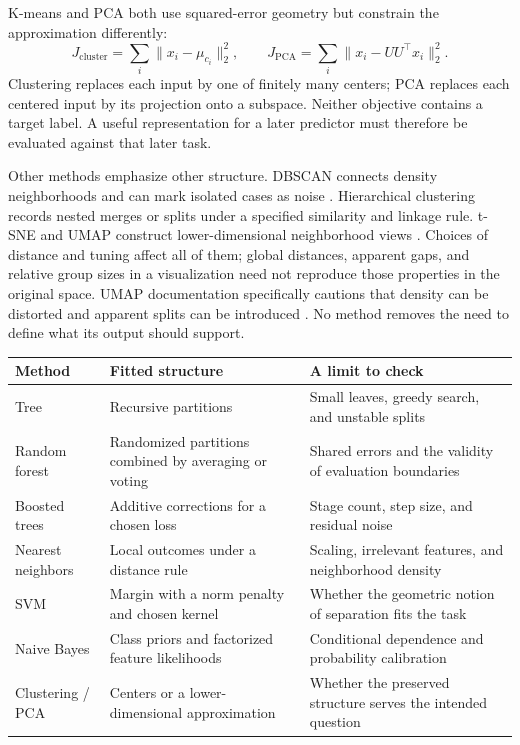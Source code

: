 K-means and PCA both use squared-error geometry but constrain the approximation differently:
\[
J_{\mathrm{cluster}}=\sum_i\|x_i-\mu_{c_i}\|_2^2,
\qquad J_{\mathrm{PCA}}=\sum_i\|x_i-UU^\top x_i\|_2^2.
\]
Clustering replaces each input by one of finitely many centers; PCA replaces each centered input by its projection onto a subspace. Neither objective contains a target label. A useful representation for a later predictor must therefore be evaluated against that later task.

Other methods emphasize other structure. DBSCAN connects density neighborhoods and can mark isolated cases as noise \citep{ester1996dbscan}. Hierarchical clustering records nested merges or splits under a specified similarity and linkage rule. t-SNE and UMAP construct lower-dimensional neighborhood views \citep{vandermaaten2008tsne,mcinnes2018umap}. Choices of distance and tuning affect all of them; global distances, apparent gaps, and relative group sizes in a visualization need not reproduce those properties in the original space. UMAP documentation specifically cautions that density can be distorted and apparent splits can be introduced \citep{umapclusteringdocs}. No method removes the need to define what its output should support.

\par\addvspace{\intextsep}\noindent\begin{minipage}{\linewidth}
\centering\small
\begin{tabular}{@{}L{2.0cm}L{4.3cm}L{3.75cm}@{}}
\toprule
Method & Fitted structure & A limit to check \\
\midrule
Tree & Recursive partitions & Small leaves, greedy search, and unstable splits \\
Random forest & Randomized partitions combined by averaging or voting & Shared errors and the validity of evaluation boundaries \\
Boosted trees & Additive corrections for a chosen loss & Stage count, step size, and residual noise \\
Nearest neighbors & Local outcomes under a distance rule & Scaling, irrelevant features, and neighborhood density \\
SVM & Margin with a norm penalty and chosen kernel & Whether the geometric notion of separation fits the task \\
Naive Bayes & Class priors and factorized feature likelihoods & Conditional dependence and probability calibration \\
Clustering / PCA & Centers or a lower-dimensional approximation & Whether the preserved structure serves the intended question \\
\bottomrule
\end{tabular}
\label{tab:method-selection}
\label{tab:chapter4-family-synthesis}
\end{minipage}\par\addvspace{\intextsep}

